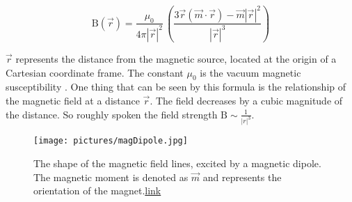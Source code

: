 \begin{equation} \label{eq:dipole}
\mathrm{B}(\vec{r}) = 
\frac{\mu_{0}}{4 \pi |\vec{r}|^{2}} \, \left (\frac{3 \vec{r} (\vec{m} \cdot \vec{r}) - \vec{m}|\vec{r}|^{2} }{|\vec{r}|^3} \right)						
\end{equation}

$ \vec{r} $ represents the distance from the magnetic source, located at the origin of a Cartesian coordinate frame. The constant $ \mu_{0} $ is the vacuum magnetic susceptibility \cite{camacho2013alternative}. One thing that can be seen by this formula is the relationship of the magnetic field at a distance $ \vec{r} $. The field decreases by a cubic magnitude of the distance. So roughly spoken the field strength $ \mathrm{B} \sim \frac{1}{|r|^ {3}}$.

\begin{figure}
\centering
\texttt{[image: pictures/magDipole.jpg]}
\caption{The shape of the magnetic field lines, excited by a magnetic dipole. The magnetic moment is denoted as $ \vec{m} $ and represents the orientation of the magnet.\href{http://cdn1.askiitians.com/Images/201529-161356533-148-download.jpg}{link}}
\label{fig:magDipole}
\end{figure}

